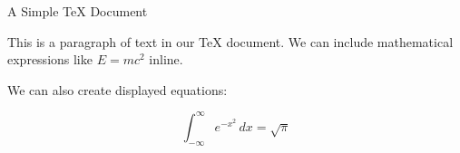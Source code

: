 \documentclass{article}
\begin{document}
\centerline{A Simple TeX Document} %
\medskip %

This is a paragraph of text in our TeX document. We can include
mathematical expressions like $E = mc^2$ inline.

\bigskip %

We can also create displayed equations:

$$
\int_{-\infty}^\infty e^{-x^2} \, dx = \sqrt{\pi}
$$
\end{document}
